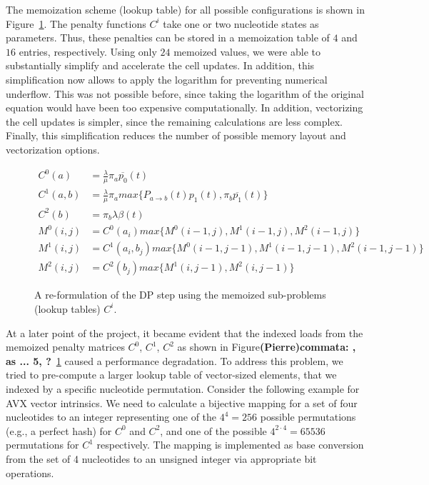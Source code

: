 \documentclass[runningheads,a4paper]{llncs}
\begin{document}
The memoization scheme (lookup table) for all possible configurations is shown in Figure~\ref{fig:memo}.
The penalty functions $C^i$ take one or two nucleotide states as parameters.
Thus, these penalties can be stored in a memoization table of $4$ and $16$ entries, respectively.
Using only $24$ memoized values, we were able to substantially simplify and accelerate the cell updates.
In addition, this simplification now allows to apply the logarithm for preventing numerical underflow.
This was not possible before, since taking the logarithm of the original equation would have been too expensive computationally.
In addition, vectorizing the cell updates is simpler, since the remaining calculations are less complex.
Finally, this simplification reduces the number of possible memory layout and vectorization options.

\begin{figure}
\[
\begin{aligned}
  C^0(a)&=\frac{\lambda}{\mu}\pi_{a}\overline{p_0}(t)\\
  C^1(a, b)&=\frac{\lambda}{\mu}\pi_{a}max\{P_{a \rightarrow b}(t) p_1(t), \pi_{b}\overline{p_1}(t)\}\\
  C^2(b)&=\pi_{b}\lambda\beta(t)\\
  M^0(i,j)&=C^0(a_i)max\{M^0(i-1, j), M^1(i-1,j), M^2(i-1,j)\}\\
  M^1(i,j)&=C^1(a_i,b_j)max\{M^0(i-1, j-1), M^1(i-1,j-1), M^2(i-1,j-1)\}\\
  M^2(i,j)&=C^2(b_j)max\{M^1(i,j-1), M^2(i,j-1)\}
\end{aligned}
\]
\caption{A re-formulation of the DP step using the memoized sub-problems (lookup tables) $C^i$.}
\label{fig:memo}
\end{figure}

At a later point of the project, it became evident that the indexed loads from the memoized penalty matrices $C^0$, $C^1$, $C^2$ as shown in Figure\textbf{(Pierre)commata: , as ... 5, ?}~\ref{fig:memo}
caused a performance degradation.
To address this problem, we tried to pre-compute a larger lookup table of vector-sized elements, that we indexed by a specific nucleotide permutation.
Consider the following example for AVX vector intrinsics.
We need to calculate a bijective mapping for a set of four nucleotides to an integer representing one of the $4^4 = 256$ possible permutations (e.g., a perfect hash)
for $C^0$ and $C^2$, and one of the possible $4^{2 \cdot 4} = 65536$ permutations for $C^1$ respectively.
The mapping is implemented as base conversion from the set of 4 nucleotides to an unsigned integer via appropriate bit operations.
\end{document}
